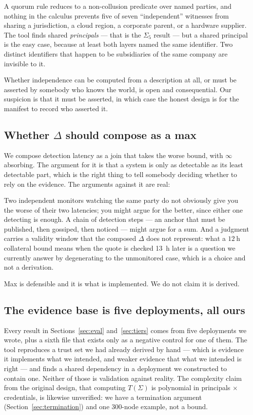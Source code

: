 \documentclass[11pt]{article}
\newcommand{\Never}{\infty}
\begin{document}
A quorum rule reduces to a non-collusion predicate over named parties, and
nothing in the calculus prevents five of seven ``independent'' witnesses from
sharing a jurisdiction, a cloud region, a corporate parent, or a hardware
supplier. The tool finds shared \emph{principals} --- that is the $\Sigma_5$
result --- but a shared principal is the easy case, because at least both
layers named the same identifier. Two distinct identifiers that happen to be
subsidiaries of the same company are invisible to it.

Whether independence can be computed from a description at all, or must be
asserted by somebody who knows the world, is open and consequential. Our
suspicion is that it must be asserted, in which case the honest design is for
the manifest to record who asserted it.

\subsection{Whether $\Delta$ should compose as a max}

We compose detection latency as a join that takes the worse bound, with
$\Never$ absorbing. The argument for it is that a system is only as detectable
as its least detectable part, which is the right thing to tell somebody
deciding whether to rely on the evidence. The arguments against it are real:

Two independent monitors watching the same party do not obviously give you the
worse of their two latencies; you might argue for the better, since either one
detecting is enough. A chain of detection steps --- an anchor that must be
published, then gossiped, then noticed --- might argue for a sum. And a
judgment carries a validity window that the composed $\Delta$ does not
represent: what a $\SI{12}{\hour}$ collateral bound means when the quote is
checked \SI{13}{\hour} later is a question we currently answer by degenerating
to the unmonitored case, which is a choice and not a derivation.

Max is defensible and it is what is implemented. We do not claim it is
derived.

\subsection{The evidence base is five deployments, all ours}

Every result in Sections~\ref{sec:eval} and~\ref{sec:tiers} comes from five
deployments we wrote,
plus a sixth file that exists only as a negative control for one of them. The
tool reproduces a trust set we had already derived by hand --- which is
evidence it implements what we intended, and weaker evidence that what we
intended is right --- and finds a shared dependency in a deployment we
constructed to contain one. Neither of those is validation against reality.
The complexity claim from the original design, that computing $T(\Sigma)$ is
polynomial in principals $\times$ credentials, is likewise unverified: we have
a termination argument (Section~\ref{sec:termination}) and one 300-node
example, not a bound.
\end{document}
